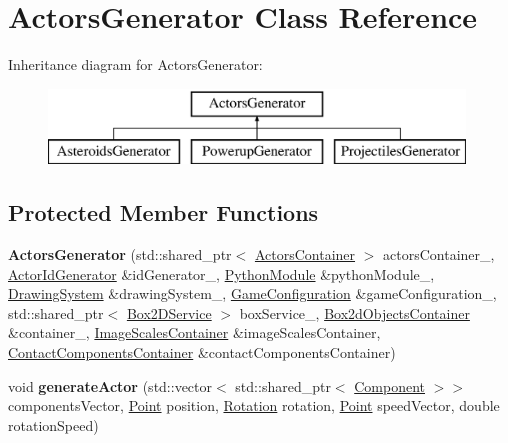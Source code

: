 \hypertarget{classActorsGenerator}{}\section{Actors\+Generator Class Reference}
\label{classActorsGenerator}
Inheritance diagram for Actors\+Generator\+:\begin{figure}[H]
\begin{center}
\leavevmode
\includegraphics[height=2.000000cm]{classActorsGenerator}
\end{center}
\end{figure}
\subsection*{Protected Member Functions}
\begin{DoxyCompactItemize}
\item 
{\bfseries Actors\+Generator} (std\+::shared\+\_\+ptr$<$ \hyperlink{classActorsContainer}{Actors\+Container} $>$ actors\+Container\+\_\+, \hyperlink{classActorIdGenerator}{Actor\+Id\+Generator} \&id\+Generator\+\_\+, \hyperlink{classPythonModule}{Python\+Module} \&python\+Module\+\_\+, \hyperlink{classDrawingSystem}{Drawing\+System} \&drawing\+System\+\_\+, \hyperlink{classGameConfiguration}{Game\+Configuration} \&game\+Configuration\+\_\+, std\+::shared\+\_\+ptr$<$ \hyperlink{classBox2DService}{Box2\+D\+Service} $>$ box\+Service\+\_\+, \hyperlink{classBox2dObjectsContainer}{Box2d\+Objects\+Container} \&container\+\_\+, \hyperlink{classImageScalesContainer}{Image\+Scales\+Container} \&image\+Scales\+Container, \hyperlink{classContactComponentsContainer}{Contact\+Components\+Container} \&contact\+Components\+Container)\hypertarget{classActorsGenerator_aab32aafd3494be1c40a13e13b0e192ae}{}\label{classActorsGenerator_aab32aafd3494be1c40a13e13b0e192ae}

\item 
void {\bfseries generate\+Actor} (std\+::vector$<$ std\+::shared\+\_\+ptr$<$ \hyperlink{classComponent}{Component} $>$$>$ components\+Vector, \hyperlink{classPoint}{Point} position, \hyperlink{classRotation}{Rotation} rotation, \hyperlink{classPoint}{Point} speed\+Vector, double rotation\+Speed)\hypertarget{classActorsGenerator_a2c45dd6a3d9620c9544eff75a7c8aed1}{}\label{classActorsGenerator_a2c45dd6a3d9620c9544eff75a7c8aed1}

\end{DoxyCompactItemize}
